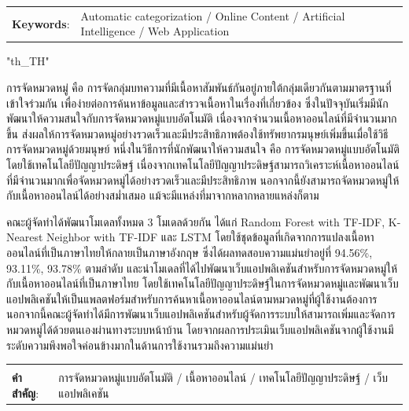\documentclass[12pt,oneside,openright,a4paper]{cpe-thai-project}
\begin{document}
\begin{flushleft}
\begin{tabular*}{\textwidth}{@{}lp{}}
\textbf{Keywords}: & Automatic categorization / Online Content / Artificial Intelligence / Web Application
\end{tabular*}
\end{flushleft}
\endabstract

\XeTeXlinebreaklocale "th_TH"	
\thaifont
\thaiabstract

\hspace{1cm}การจัดหมวดหมู่ คือ การจัดกลุ่มบทความที่มีเนื้อหาสัมพันธ์กันอยู่ภายใต้กลุ่มเดียวกันตามมาตรฐานที่เข้าใจร่วมกัน 
เพื่อง่ายต่อการค้นหาข้อมูลและสำรวจเนื้อหาในเรื่องที่เกี่ยวข้อง ซึ่งในปัจจุบันเริ่มมีนักพัฒนาให้ความสนใจกับการจัดหมวดหมู่แบบอัตโนมัติ 
เนื่องจากจำนวนเนื้อหาออนไลน์ที่มีจำนวนมากขึ้น ส่งผลให้การจัดหมวดหมู่อย่างรวดเร็วและมีประสิทธิภาพต้องใช้ทรัพยากรมนุษย์เพิ่มขึ้นเมื่อใช้วิธีการจัดหมวดหมู่ด้วยมนุษย์
หนึ่งในวิธีการที่นักพัฒนาให้ความสนใจ คือ การจัดหมวดหมู่แบบอัตโนมัติโดยใช้เทคโนโลยีปัญญาประดิษฐ์ 
เนื่องจากเทคโนโลยีปัญญาประดิษฐ์สามารถวิเคราะห์เนื้อหาออนไลน์ที่มีจำนวนมากเพื่อจัดหมวดหมู่ได้อย่างรวดเร็วและมีประสิทธิภาพ 
นอกจากนี้ยังสามารถจัดหมวดหมู่ให้กับเนื้อหาออนไลน์ได้อย่างสม่ำเสมอ แม้จะมีแหล่งที่มาจากหลากหลายแหล่งก็ตาม

\hspace{1cm}คณะผู้จัดทำได้พัฒนาโมเดลทั้งหมด 3 โมเดลด้วยกัน ได้แก่ 
Random Forest with TF-IDF, K-Nearest Neighbor with TF-IDF และ LSTM
โดยใช้ชุดข้อมูลที่เกิดจากการแปลงเนื้อหาออนไลน์ที่เป็นภาษาไทยให้กลายเป็นภาษาอังกฤษ
ซึ่งได้ผลทดสอบความแม่นยำอยู่ที่ 94.56\%, 93.11\%, 93.78\% ตามลำดับ
และนำโมเดลที่ได้ไปพัฒนาเว็บแอปพลิเคชันสำหรับการจัดหมวดหมู่ให้กับเนื้อหาออนไลน์ที่เป็นภาษาไทย 
โดยใช้เทคโนโลยีปัญญาประดิษฐ์ในการจัดหมวดหมู่และพัฒนาเว็บแอปพลิเคชันให้เป็นแพลตฟอร์มสำหรับการค้นหาเนื้อหาออนไลน์ตามหมวดหมู่ที่ผู้ใช้งานต้องการ
นอกจากนี้คณะผู้จัดทำได้มีการพัฒนาเว็บแอปพลิเคชันสำหรับผู้จัดการระบบให้สามารถเพิ่มและจัดการหมวดหมู่ได้ด้วยตนเองผ่านทางระบบหน้าบ้าน
โดยจากผลการประเมินเว็บแอปพลิเคชันจากผู้ใช้งานมีระดับความพึงพอใจค่อนข้างมากในด้านการใช้งานรวมถึงความแม่นยำ

\begin{flushleft}
\begin{tabular*}{\textwidth}{@{}lp{}}
 & \\

\textbf{คำสำคัญ}: & การจัดหมวดหมู่แบบอัตโนมัติ / เนื้อหาออนไลน์ / เทคโนโลยีปัญญาประดิษฐ์ /  เว็บแอปพลิเคชัน
\end{tabular*}
\end{flushleft}
\endabstract
\end{document}
